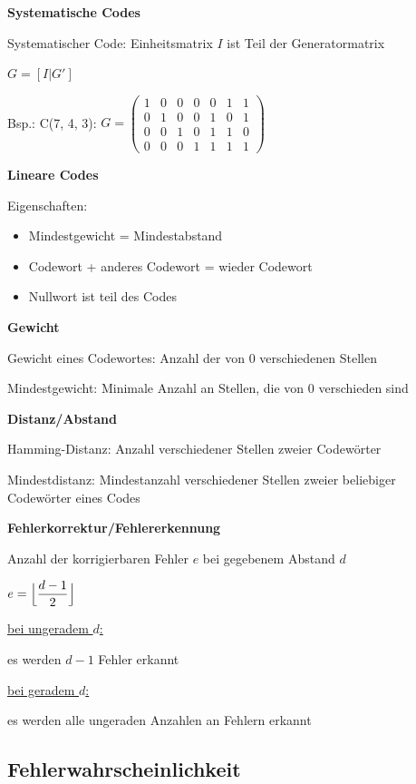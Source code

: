 \textbf{Systematische Codes}

Systematischer Code: Einheitsmatrix $I$ ist Teil der Generatormatrix

$\displaystyle{
    G = [I | G']
}$

Bsp.: C(7, 4, 3): 
$\displaystyle{
    G =
    \begin{pmatrix}
        1 & 0 & 0 & 0 & 0 & 1 & 1\\
        0 & 1 & 0 & 0 & 1 & 0 & 1\\
        0 & 0 & 1 & 0 & 1 & 1 & 0\\
        0 & 0 & 0 & 1 & 1 & 1 & 1
    \end{pmatrix}
}$

\textbf{Lineare Codes}

Eigenschaften:
\begin{itemize}
    \item Mindestgewicht = Mindestabstand
    \item Codewort + anderes Codewort = wieder Codewort
    \item Nullwort ist teil des Codes
\end{itemize}

\textbf{Gewicht}

Gewicht eines Codewortes: Anzahl der von 0 verschiedenen Stellen

Mindestgewicht: Minimale Anzahl an Stellen, die von 0 verschieden sind

\textbf{Distanz/Abstand}

Hamming-Distanz: Anzahl verschiedener Stellen zweier Codewörter

Mindestdistanz: Mindestanzahl verschiedener Stellen zweier beliebiger Codewörter eines Codes

\textbf{Fehlerkorrektur/Fehlererkennung}

Anzahl der korrigierbaren Fehler $e$ bei gegebenem Abstand $d$

$\displaystyle{
    e = \Bigl\lfloor \frac{d - 1}{2} \Bigr\rfloor
}$

\underline{bei ungeradem $d$:}

es werden $d-1$ Fehler erkannt

\underline{bei geradem $d$:}

es werden alle ungeraden Anzahlen an Fehlern erkannt

\subsection{Fehlerwahrscheinlichkeit}

